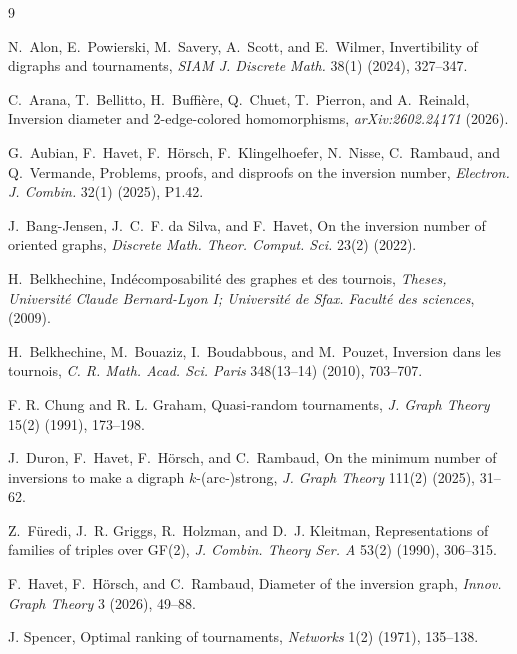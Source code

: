 \documentclass[11pt]{article}
\theoremstyle{remark}
\begin{document}
\begin{thebibliography}{9}

N.~Alon, E.~Powierski, M.~Savery, A.~Scott, and E.~Wilmer,
Invertibility of digraphs and tournaments,
\emph{SIAM J. Discrete Math.} 38(1) (2024), 327--347.

C.~Arana, T.~Bellitto, H.~Buffi\`ere, Q.~Chuet, T.~Pierron, and A.~Reinald,
Inversion diameter and 2-edge-colored homomorphisms, \emph{arXiv:2602.24171} 
(2026).

G.~Aubian, F.~Havet, F.~H\"orsch, F.~Klingelhoefer, N.~Nisse, C.~Rambaud, and Q.~Vermande,
Problems, proofs, and disproofs on the inversion number,
\emph{Electron. J. Combin.} 32(1) (2025), P1.42. 

J.~Bang-Jensen, J.~C.~F. da Silva, and F.~Havet,
On the inversion number of oriented graphs,
\emph{Discrete Math. Theor. Comput. Sci.} 23(2) (2022).


H.~Belkhechine, 
   {Ind{\'e}composabilit{\'e} des graphes et des tournois}, \emph{
  Theses, {Universit{\'e} Claude Bernard-Lyon I; Universit{\'e} de
  Sfax. Facult{\'e} des sciences}},  (2009).

  
H.~Belkhechine, M.~Bouaziz, I.~Boudabbous, and M.~Pouzet,
Inversion dans les tournois,
\emph{C. R. Math. Acad. Sci. Paris} 348(13--14) (2010), 703--707.


    F. R. Chung and R. L. Graham,  Quasi‐random tournaments, \emph{J. Graph Theory} 15(2) (1991), 173--198.

    
J.~Duron, F.~Havet, F.~H\"orsch, and C.~Rambaud,
On the minimum number of inversions to make a digraph $k$-(arc-)strong,
\emph{J. Graph Theory} 111(2) (2025), 31--62.

Z.~F\"uredi, J.~R. Griggs, R.~Holzman, and D.~J. Kleitman,
Representations of families of triples over GF(2),
\emph{J. Combin. Theory Ser. A} 53(2) (1990), 306--315.


F.~Havet, F.~H\"orsch, and C.~Rambaud,
Diameter of the inversion graph,
\emph{Innov. Graph Theory} 3 (2026), 49--88.

J. Spencer,  Optimal ranking of tournaments,  \emph{Networks} 1(2) (1971),  135--138.


\end{thebibliography}
\end{document}

